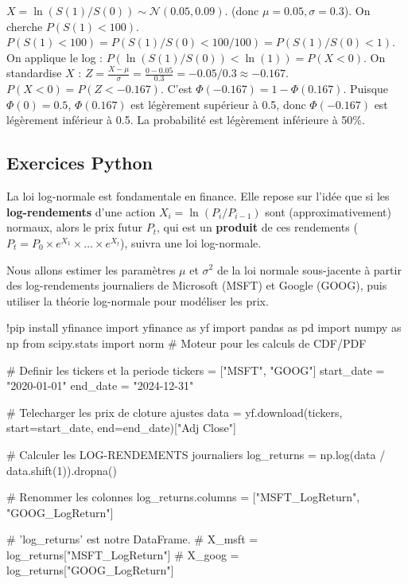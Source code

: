 \begin{correctionbox}
$X = \ln(S(1)/S(0)) \sim \mathcal{N}(0.05, 0.09)$. (donc $\mu=0.05, \sigma=0.3$).
On cherche $P(S(1) < 100)$.
$P(S(1) < 100) = P(S(1)/S(0) < 100/100) = P(S(1)/S(0) < 1)$.
On applique le log :
$P(\ln(S(1)/S(0)) < \ln(1)) = P(X < 0)$.
On standardise $X$ :
$Z = \frac{X - \mu}{\sigma} = \frac{0 - 0.05}{0.3} = -0.05 / 0.3 \approx -0.167$.
$P(X < 0) = P(Z < -0.167)$.
C'est $\Phi(-0.167) = 1 - \Phi(0.167)$. Puisque $\Phi(0) = 0.5$, $\Phi(0.167)$ est légèrement supérieur à 0.5, donc $\Phi(-0.167)$ est légèrement inférieur à 0.5. La probabilité est légèrement inférieure à 50\%.
\end{correctionbox}

\subsection{Exercices Python}

La loi log-normale est fondamentale en finance. Elle repose sur l'idée que si les \textbf{log-rendements} d'une action $X_i = \ln(P_i / P_{i-1})$ sont (approximativement) normaux, alors le prix futur $P_t$, qui est un \textbf{produit} de ces rendements ($P_t = P_0 \times e^{X_1} \times \dots \times e^{X_t}$), suivra une loi log-normale.

Nous allons estimer les paramètres $\mu$ et $\sigma^2$ de la loi normale sous-jacente à partir des log-rendements journaliers de Microsoft (MSFT) et Google (GOOG), puis utiliser la théorie log-normale pour modéliser les prix.

\begin{codecell}
!pip install yfinance
import yfinance as yf
import pandas as pd
import numpy as np
from scipy.stats import norm # Moteur pour les calculs de CDF/PDF

# Definir les tickers et la periode
tickers = ["MSFT", "GOOG"]
start_date = "2020-01-01"
end_date = "2024-12-31"

# Telecharger les prix de cloture ajustes
data = yf.download(tickers, start=start_date, end=end_date)["Adj Close"]

# Calculer les LOG-RENDEMENTS journaliers
log_returns = np.log(data / data.shift(1)).dropna()

# Renommer les colonnes
log_returns.columns = ["MSFT_LogReturn", "GOOG_LogReturn"]

# 'log_returns' est notre DataFrame.
# X_msft = log_returns["MSFT_LogReturn"]
# X_goog = log_returns["GOOG_LogReturn"]
\end{codecell}

